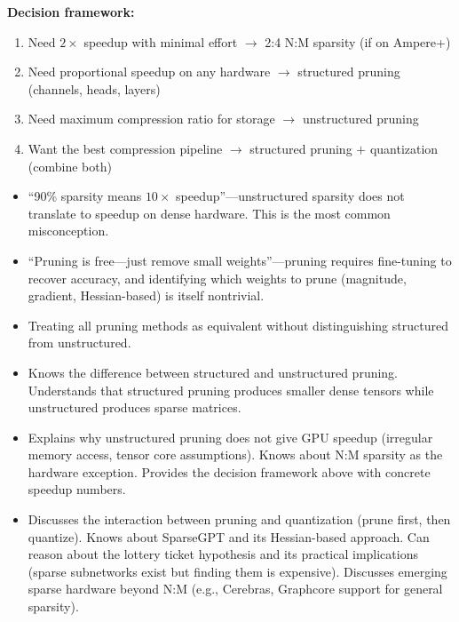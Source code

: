 \begin{interviewq}
\textbf{Decision framework:}
\begin{enumerate}
    \item Need $2\times$ speedup with minimal effort $\to$ 2:4 N:M sparsity (if on Ampere+)
    \item Need proportional speedup on any hardware $\to$ structured pruning (channels, heads, layers)
    \item Need maximum compression ratio for storage $\to$ unstructured pruning
    \item Want the best compression pipeline $\to$ structured pruning $+$ quantization (combine both)
\end{enumerate}

\redflags
\begin{itemize}
    \item ``90\% sparsity means $10\times$ speedup''---unstructured sparsity does not translate to speedup on dense hardware. This is the most common misconception.
    \item ``Pruning is free---just remove small weights''---pruning requires fine-tuning to recover accuracy, and identifying which weights to prune (magnitude, gradient, Hessian-based) is itself nontrivial.
    \item Treating all pruning methods as equivalent without distinguishing structured from unstructured.
\end{itemize}


\goodgreat
\begin{itemize}
    \item {} Knows the difference between structured and unstructured pruning. Understands that structured pruning produces smaller dense tensors while unstructured produces sparse matrices.
    \item {} Explains why unstructured pruning does not give GPU speedup (irregular memory access, tensor core assumptions). Knows about N:M sparsity as the hardware exception. Provides the decision framework above with concrete speedup numbers.
    \item {} Discusses the interaction between pruning and quantization (prune first, then quantize). Knows about SparseGPT and its Hessian-based approach. Can reason about the lottery ticket hypothesis and its practical implications (sparse subnetworks exist but finding them is expensive). Discusses emerging sparse hardware beyond N:M (e.g., Cerebras, Graphcore support for general sparsity).
\end{itemize}

\end{interviewq}

